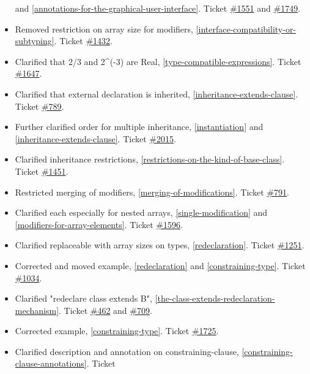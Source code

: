 \documentclass[../MLS.tex]{subfiles}
\begin{document}
\begin{itemize}
  and \autoref{annotations-for-the-graphical-user-interface}. Ticket
  \href{https://trac.modelica.org/Modelica/ticket/1551}{\#1551} and
  \href{https://trac.modelica.org/Modelica/ticket/1749}{\#1749}.
\item
  Removed restriction on array size for modifiers, \autoref{interface-compatibility-or-subtyping}. Ticket
  \href{https://trac.modelica.org/Modelica/ticket/1432}{\#1432}.
\item
  Clarified that 2/3 and 2\^{}(-3) are Real, \autoref{type-compatible-expressions}. Ticket
  \href{https://trac.modelica.org/Modelica/ticket/1647}{\#1647}.
\item
  Clarified that external declaration is inherited, \autoref{inheritance-extends-clause}. Ticket
  \href{https://trac.modelica.org/Modelica/ticket/789}{\#789}.
\item
  Further clarified order for multiple inheritance, \autoref{instantiation} and
  \autoref{inheritance-extends-clause}. Ticket
  \href{https://trac.modelica.org/Modelica/ticket/2015}{\#2015}.
\item
  Clarified inheritance restrictions, \autoref{restrictions-on-the-kind-of-base-class}. Ticket
  \href{https://trac.modelica.org/Modelica/ticket/1451}{\#1451}.
\item
  Restricted merging of modifiers, \autoref{merging-of-modifications}. Ticket
  \href{https://trac.modelica.org/Modelica/ticket/791}{\#791}.
\item
  Clarified each especially for nested arrays, \autoref{single-modification} and \autoref{modifiers-for-array-elements}.
  Ticket \href{https://trac.modelica.org/Modelica/ticket/1596}{\#1596}.
\item
  Clarified replaceable with array sizes on types, \autoref{redeclaration}. Ticket
  \href{https://trac.modelica.org/Modelica/ticket/1251}{\#1251}.
\item
  Corrected and moved example, \autoref{redeclaration} and \autoref{constraining-type}. Ticket
  \href{https://trac.modelica.org/Modelica/ticket/1034}{\#1034}.
\item
  Clarified "redeclare class extends B", \autoref{the-class-extends-redeclaration-mechanism}. Ticket
  \href{https://trac.modelica.org/Modelica/ticket/462}{\#462} and
  \href{https://trac.modelica.org/Modelica/ticket/709}{\#709}.
\item
  Corrected example, \autoref{constraining-type}. Ticket
  \href{https://trac.modelica.org/Modelica/ticket/1725}{\#1725}.
\item
  Clarified description and annotation on constraining-clause, \autoref{constraining-clause-annotations}. Ticket

\end{itemize}
\end{document}
